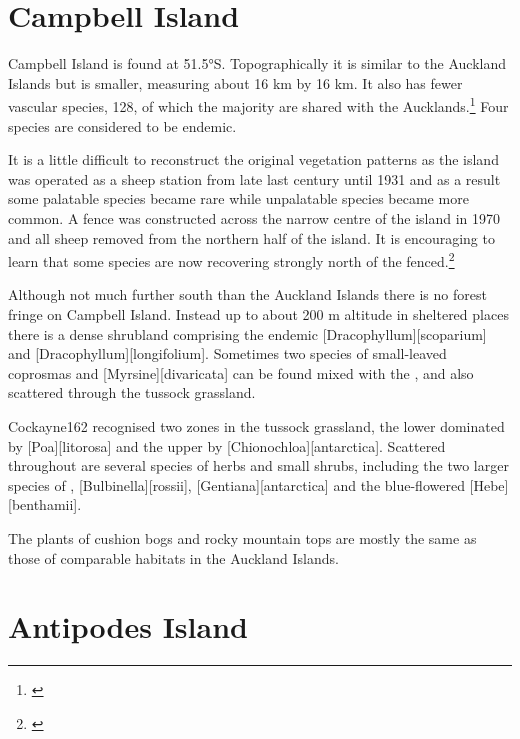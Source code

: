 \section{Campbell Island}

Campbell Island is found at 51.5°S.
Topographically it is similar to the Auckland Islands but is smaller, measuring about 16 km by 16 km.
It also has fewer vascular species, 128, of which the majority are shared with the Aucklands.\footnote{\cite{oliver1951botanical}}
Four species are considered to be endemic.

It is a little difficult to reconstruct the original vegetation patterns as the island was operated as a sheep station from late last century until 1931 and as a result some palatable species became rare while unpalatable species became more common.
A fence was constructed across the narrow centre of the island in 1970 and all sheep removed from the northern half of the island.
It is encouraging to learn that some species are now recovering strongly north of the fenced.\footnote{\cite{meurk1982regeneration}}

Although not much further south than the Auckland Islands there is no forest fringe on Campbell Island.
Instead up to about 200 m altitude in sheltered places there is a dense shrubland comprising the endemic [Dracophyllum][scoparium] and [Dracophyllum][longifolium].
Sometimes two species of small-leaved coprosmas and [Myrsine][divaricata] can be found mixed with the , and also scattered through the tussock grassland.

Cockayne162 recognised two zones in the tussock grassland, the lower dominated by [Poa][litorosa] and the upper by [Chionochloa][antarctica].
Scattered throughout are several species of herbs and small shrubs, including the two larger species of , [Bulbinella][rossii], [Gentiana][antarctica] and the blue-flowered [Hebe][benthamii].

The plants of cushion bogs and rocky mountain tops are mostly the same as those of comparable habitats in the Auckland Islands.

\section{Antipodes Island}

